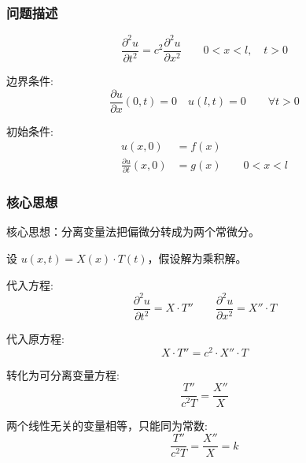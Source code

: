 \documentclass[a4paper, 12pt, oneside]{article} %
\numberwithin{subsection}{section}
\numberwithin{subsubsection}{subsection}
\theoremstyle{plain}
\theoremstyle{definition}
\theoremstyle{remark}
\begin{document}
		\subsubsection{问题描述}
		\begin{equation} \label{eq:wave_equation_mixed2}
			\frac{\partial^2 u}{\partial t^2} = c^2 \frac{\partial^2 u}{\partial x^2} \qquad 0 < x < l, \quad t > 0
		\end{equation}
		
		边界条件:
		\begin{equation} \label{eq:boundary_conditions_mixed2}
			\frac{\partial u}{\partial x}(0, t) = 0 \quad u(l, t) = 0 \qquad \forall t > 0
		\end{equation}
		
		初始条件:
		\begin{equation} \label{eq:initial_conditions_mixed2}
			\begin{aligned}
				u(x, 0) &= f(x) \\
				\frac{\partial u}{\partial t}(x, 0) &= g(x) \qquad 0 < x < l
			\end{aligned}
		\end{equation}
		
		\subsubsection{核心思想}
		核心思想：分离变量法把偏微分转成为两个常微分。
		
		设 \(u(x, t) = X(x) \cdot T(t)\)，假设解为乘积解。
		
		代入方程:
		\begin{equation} \label{eq:substitution_mixed2}
			\frac{\partial^2 u}{\partial t^2} = X \cdot T'' \qquad \frac{\partial^2 u}{\partial x^2} = X'' \cdot T
		\end{equation}
		
		代入原方程:
		\begin{equation} \label{eq:original_substitution_mixed2}
			X \cdot T'' = c^2 \cdot X'' \cdot T
		\end{equation}
		
		转化为可分离变量方程:
		\begin{equation} \label{eq:separation_mixed2}
			\frac{T''}{c^2 T} = \frac{X''}{X}
		\end{equation}
		
		两个线性无关的变量相等，只能同为常数:
		\begin{equation} \label{eq:constant_mixed2}
			\frac{T''}{c^2 T} = \frac{X''}{X} = k
		\end{equation}
		
\end{document}
